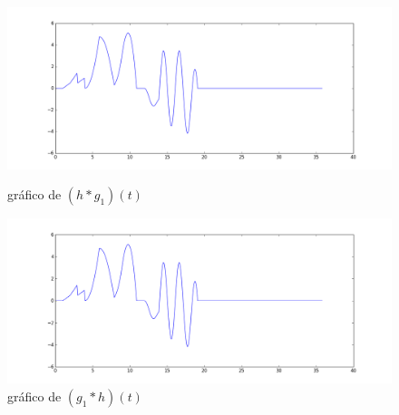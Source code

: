\documentclass[12pt]{article}
\begin{document}
\begin{figure}[!h]
	\centering
	\begin{minipage}[b]{0.49\linewidth}
		\includegraphics[width=1.15\linewidth]{h*g1.png}
		\caption{gráfico de $(h*g_1)(t)$}
	\end{minipage}
	\hfill
	\begin{minipage}[b]{0.49\linewidth}
		\includegraphics[width=1.15\linewidth]{g1*h.png}
		\caption{gráfico de $(g_1*h)(t)$}
	\end{minipage}
\end{figure}
\end{document}
